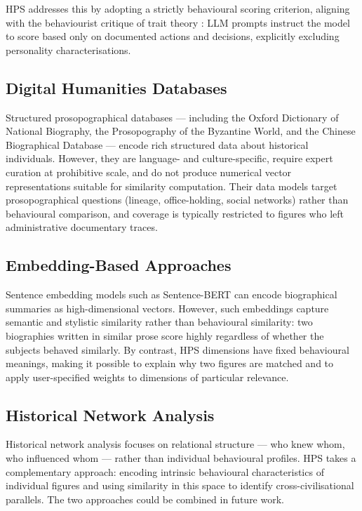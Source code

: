 \documentclass[11pt, a4paper]{report}
\begin{document}
HPS addresses this by adopting a strictly behavioural scoring criterion, aligning with the behaviourist critique of trait theory \citep{mischel1968}: LLM prompts instruct the model to score based only on documented actions and decisions, explicitly excluding personality characterisations.

\subsection{Digital Humanities Databases}

Structured prosopographical databases — including the Oxford Dictionary of National Biography, the Prosopography of the Byzantine World, and the Chinese Biographical Database \citep{bradley2005} — encode rich structured data about historical individuals. However, they are language- and culture-specific, require expert curation at prohibitive scale, and do not produce numerical vector representations suitable for similarity computation. Their data models target prosopographical questions (lineage, office-holding, social networks) rather than behavioural comparison, and coverage is typically restricted to figures who left administrative documentary traces.

\subsection{Embedding-Based Approaches}

Sentence embedding models such as Sentence-BERT \citep{reimers2019} can encode biographical summaries as high-dimensional vectors. However, such embeddings capture semantic and stylistic similarity rather than behavioural similarity: two biographies written in similar prose score highly regardless of whether the subjects behaved similarly. By contrast, HPS dimensions have fixed behavioural meanings, making it possible to explain why two figures are matched and to apply user-specified weights to dimensions of particular relevance.

\subsection{Historical Network Analysis}

Historical network analysis \citep{padgett1993, bearman1993} focuses on relational structure — who knew whom, who influenced whom — rather than individual behavioural profiles. HPS takes a complementary approach: encoding intrinsic behavioural characteristics of individual figures and using similarity in this space to identify cross-civilisational parallels. The two approaches could be combined in future work.
\end{document}
